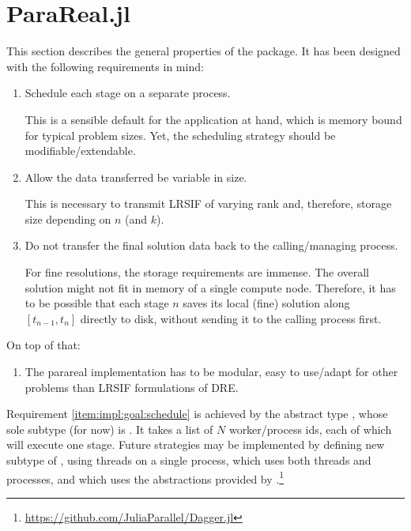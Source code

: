 \section{ParaReal.jl}

This section describes the general properties of the  package.
It has been designed with the following requirements in mind:
\begin{enumerate}
  \item\label{item:impl:goal:schedule}
    Schedule each stage on a separate process.

    This is a sensible default for the application at hand,
    which is memory bound for typical problem sizes.
    Yet, the scheduling strategy should be modifiable/extendable.
  \item\label{item:impl:goal:variablesize}
    Allow the data transferred be variable in size.

    This is necessary to transmit \ac{LRSIF} of varying rank and, therefore, storage size depending on $n$ (and $k$).
  \item\label{item:impl:goal:notransfer}
    Do not transfer the final solution data back to the calling/managing process.

    For fine resolutions, the storage requirements are immense.
    The overall solution might not fit in memory of a single compute node.
    Therefore, it has to be possible that each stage $n$ saves its local (fine) solution along $[t_{n-1},t_n]$ directly to disk,
    without sending it to the calling process first.
\end{enumerate}
On top of that:
\begin{enumerate}[resume]
  \item\label{item:impl:goal:modularity}
    The parareal implementation has to be modular,
    \ie easy to use/adapt for other problems than \ac{LRSIF} formulations of \ac{DRE}.
\end{enumerate}

Requirement \ref{item:impl:goal:schedule} is achieved by the abstract type ,
whose sole subtype (for now) is .
It takes a list of $N$ worker/process ids, each of which will execute one stage.
Future strategies may be implemented by defining new subtype of , \eg
{} using threads on a single process,
 which uses both threads and processes, and
 which uses the abstractions provided by .\footnote{\url{https://github.com/JuliaParallel/Dagger.jl}}

